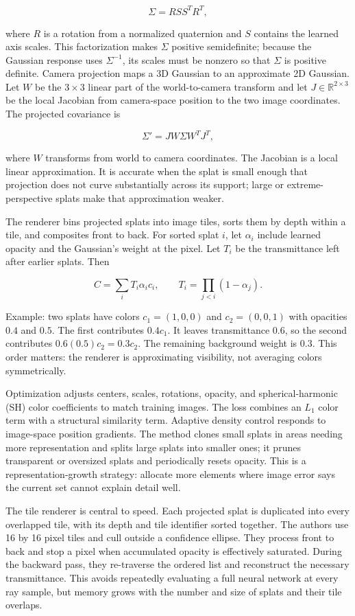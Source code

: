 \[\Sigma=R S S^T R^T,\]

where \(R\) is a rotation from a normalized quaternion and \(S\) contains the learned axis scales. This factorization makes \(\Sigma\) positive semidefinite; because the Gaussian response uses \(\Sigma^{-1}\), its scales must be nonzero so that \(\Sigma\) is positive definite. Camera projection maps a 3D Gaussian to an approximate 2D Gaussian. Let \(W\) be the \(3\times3\) linear part of the world-to-camera transform and let \(J\in\mathbb{R}^{2\times3}\) be the local Jacobian from camera-space position to the two image coordinates. The projected covariance is

\[\Sigma'=J W\Sigma W^TJ^T,\]

where \(W\) transforms from world to camera coordinates. The Jacobian is a local linear approximation. It is accurate when the splat is small enough that projection does not curve substantially across its support; large or extreme-perspective splats make that approximation weaker.

The renderer bins projected splats into image tiles, sorts them by depth within a tile, and composites front to back. For sorted splat \(i\), let \(\alpha_i\) include learned opacity and the Gaussian's weight at the pixel. Let \(T_i\) be the transmittance left after earlier splats. Then

\[C=\sum_i T_i\alpha_i c_i,\qquad T_i=\prod_{j<i}(1-\alpha_j).\]

Example: two splats have colors \(c_1=(1,0,0)\) and \(c_2=(0,0,1)\) with opacities \(0.4\) and \(0.5\). The first contributes \(0.4c_1\). It leaves transmittance \(0.6\), so the second contributes \(0.6(0.5)c_2=0.3c_2\). The remaining background weight is \(0.3\). This order matters: the renderer is approximating visibility, not averaging colors symmetrically.

Optimization adjusts centers, scales, rotations, opacity, and spherical-harmonic (SH) color coefficients to match training images. The loss combines an \(L_1\) color term with a structural similarity term. Adaptive density control responds to image-space position gradients. The method clones small splats in areas needing more representation and splits large splats into smaller ones; it prunes transparent or oversized splats and periodically resets opacity. This is a representation-growth strategy: allocate more elements where image error says the current set cannot explain detail well.

The tile renderer is central to speed. Each projected splat is duplicated into every overlapped tile, with its depth and tile identifier sorted together. The authors use 16 by 16 pixel tiles and cull outside a confidence ellipse. They process front to back and stop a pixel when accumulated opacity is effectively saturated. During the backward pass, they re-traverse the ordered list and reconstruct the necessary transmittance. This avoids repeatedly evaluating a full neural network at every ray sample, but memory grows with the number and size of splats and their tile overlaps.

